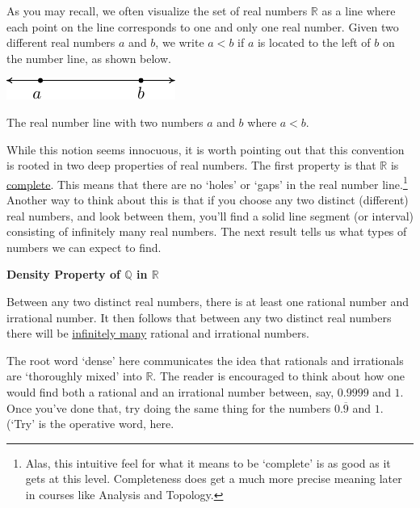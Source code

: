 \documentclass[11pt]{article}
\theoremstyle{definition}  %
\newcommand{\bbm}{\begin{boxedminipage}{6.41in}}
\newcommand{\ebm}{\end{boxedminipage}}
\begin{document}
As you may recall, we often visualize the set of real numbers $\mathbb{R}$ as a line where each point on the line corresponds to one and only one real number.  Given two different real numbers $a$ and $b$,  we write $a < b$ if $a$ is located to the left of $b$ on the number line, as shown below.

\begin{center}

\includegraphics{SetTheory-5}

The real number line with two numbers $a$ and $b$ where $a < b$.

\end{center}

While this notion seems innocuous, it is worth pointing out that this convention is rooted in two deep properties of real numbers.  The first property is that $\mathbb{R}$ is  \href{http://en.wikipedia.org/wiki/Complete_metric_space}{\underline{complete}}. This means that there are no `holes' or `gaps' in the real number line.\footnote{Alas, this intuitive feel for what it means to be `complete' is as good as it gets at this level.  Completeness does get a much more precise meaning later in courses like Analysis and Topology.} Another way to think about this is that if you choose any two distinct (different) real numbers, and look between them, you'll find a solid line segment (or interval) consisting of infinitely many real numbers.  The next result tells us what types of numbers we can expect to find.

\medskip

\label{densityofqandp}

\colorbox{ResultColor}{\bbm

\centerline{\textbf{Density Property of $\mathbb{Q}$ in $\mathbb{R}$}}

Between any two distinct real numbers, there is at least one rational number and irrational number.  It then follows that between any two distinct real numbers there will be \underline{infinitely many} rational and irrational numbers.

\ebm}

\medskip

The root word `dense' here communicates the idea that rationals and irrationals are `thoroughly mixed' into $\mathbb{R}$.   The reader is encouraged to think about how one would find both a rational and an irrational number between, say, $0.9999$ and $1$. Once you've done that, try doing the same thing for the numbers $0.\overline{9}$ and $1$. (`Try' is the operative word, here.
\end{document}
